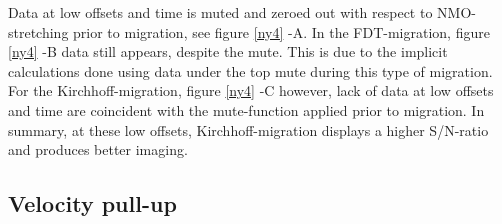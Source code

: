 \documentclass[10pt,a4paper]{article}
\begin{document}
\noindent Data at low offsets and time is muted and zeroed out with respect to NMO-stretching prior to migration, see figure \ref{ny4} -A. In the FDT-migration, figure \ref{ny4} -B data still appears, despite the mute. This is due to the implicit calculations done using data under the top mute during this type of migration. For the Kirchhoff-migration, figure \ref{ny4} -C however, lack of data at low offsets and time are coincident with the mute-function applied prior to migration. In summary, at these low offsets, Kirchhoff-migration displays a higher S/N-ratio and produces better imaging. 

\subsection{Velocity pull-up}
\end{document}
